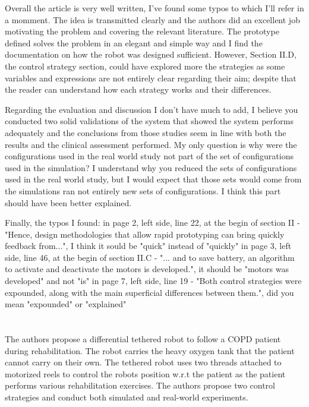 \documentclass[journal,onecolumn,12pt]{IEEEtran}
\begin{document}
Overall the article is very well written, I've found some typos to which I'll refer in a momment. The idea is transmitted clearly and the authors did an excellent job motivating the problem and covering the relevant literature. The prototype defined solves the problem in an elegant and simple way and I find the documentation on how the robot was designed sufficient. However, Section II.D, the control strategy section, could have explored more the strategies as some variables and expressions are not entirely clear regarding their aim; despite that the reader can understand how each strategy works and their differences.

\vspace{2em}

Regarding the evaluation and discussion I don't have much to add, I believe you conducted two solid validations of the system that showed the system performs adequately and the conclusions from those studies seem in line with both the results and the clinical assessment performed. My only question is why were the configurations used in the real world study not part of the set of configurations used in the simulation? I understand why you reduced the sets of configurations used in the real world study, but I would expect that those sets would come from the simulations ran not entirely new sets of configurations. I think this part should have been better explained.

\vspace{2em}

Finally, the typos I found:
      in page 2, left side, line 22, at the begin of section II - "Hence, design methodologies that allow rapid prototyping can bring quickly feedback from...", I think it sould be "quick" instead of "quickly"
      in page 3, left side, line 46, at the begin of section II.C - "... and to save battery,
an algorithm to activate and deactivate the motors is developed.", it should be "motors was developed" and not "is"
      in page 7, left side, line 19 - "Both control strategies were expounded, along with the main superficial differences between them.", did you mean "expounded" or "explained"

\vspace{2em}

\section*{}

The authors propose a differential tethered robot to follow a COPD patient during rehabilitation. The robot carries the heavy oxygen tank that the patient cannot carry on their own. The tethered robot uses two threads attached to motorized reels to control the robots position w.r.t the patient as the patient performs various rehabilitation exercises. The authors propose two control strategies and conduct both simulated and real-world experiments.
\end{document}
